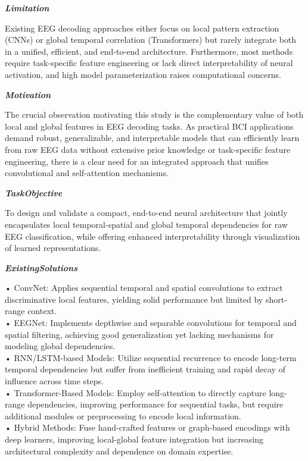 \begin{tcolorbox}[
    breakable,
    title={Example of Idea Generation in Neuroscience},
    colback=LighterGray,
    colframe=DeepPurple,
    colbacktitle=DeepPurple,
    coltitle=White,
]
\textbf{\emph{\textcolor{CaseOrange}{Limitation}}}

Existing EEG decoding approaches either focus on local pattern extraction (CNNs) or global temporal
correlation (Transformers) but rarely integrate both in a unified, efficient, and end-to-end
architecture. Furthermore, most methods require task-specific feature engineering or lack direct
interpretability of neural activation, and high model parameterization raises computational
concerns.

\textbf{\emph{\textcolor{CaseOrange}{Motivation}}}

The crucial observation motivating this study is the complementary value of both local and global
features in EEG decoding tasks. As practical BCI applications demand robust, generalizable, and
interpretable models that can efficiently learn from raw EEG data without extensive prior knowledge
or task-specific feature engineering, there is a clear need for an integrated approach that unifies
convolutional and self-attention mechanisms.

\textbf{\emph{\textcolor{CaseOrange}{TaskObjective}}}

To design and validate a compact, end-to-end neural architecture that jointly encapsulates local
temporal-spatial and global temporal dependencies for raw EEG classification, while offering
enhanced interpretability through visualization of learned representations.

\textbf{\emph{\textcolor{CaseOrange}{ExistingSolutions}}}

• ConvNet: Applies sequential temporal and spatial convolutions to extract discriminative local features, yielding solid performance but limited by short-range context. \\
• EEGNet: Implements depthwise and separable convolutions for temporal and spatial filtering, achieving good generalization yet lacking mechanisms for modeling global dependencies. \\
• RNN/LSTM-based Models: Utilize sequential recurrence to encode long-term temporal dependencies but suffer from inefficient training and rapid decay of influence across time steps. \\
• Transformer-Based Models: Employ self-attention to directly capture long-range dependencies, improving performance for sequential tasks, but require additional modules or preprocessing to encode local information. \\
• Hybrid Methods: Fuse hand-crafted features or graph-based encodings with deep learners, improving local-global feature integration but increasing architectural complexity and dependence on domain expertise. 


\end{tcolorbox}
